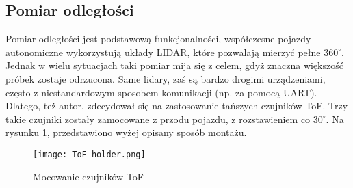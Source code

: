 
    \subsection{Pomiar odległości}
        Pomiar odległości jest podstawową funkcjonalności, współczesne pojazdy autonomiczne wykorzystują układy LIDAR, które pozwalają mierzyć pełne $360^\circ$.
        Jednak w wielu sytuacjach taki pomiar mija się z celem, gdyż znaczna większość próbek zostaje odrzucona.
        Same lidary, zaś są bardzo drogimi urządzeniami, często z niestandardowym sposobem komunikacji (np. za pomocą UART). 
        Dlatego, też autor, zdecydował się na zastosowanie tańszych czujników ToF.
        Trzy takie czujniki zostały zamocowane z przodu pojazdu, z rozstawieniem co $30^\circ$.
        Na rysunku \ref{fig:ToF_holder}, przedstawiono wyżej opisany sposób montażu.
        \begin{figure}[!ht]
            \centering
            \texttt{[image: ToF\_holder.png]}
            \caption{Mocowanie czujników ToF}
            \label{fig:ToF_holder}
        \end{figure}
